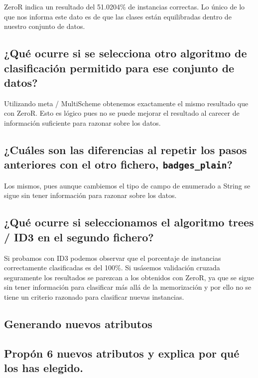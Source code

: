 \documentclass[12pt]{article}
\begin{document}
ZeroR indica un resultado del 51.0204\% de instancias correctas. Lo único de lo
que nos informa este dato es de que las clases están equilibradas dentro de
nuestro conjunto de datos.

\subsection{\small ¿Qué ocurre si se selecciona otro algoritmo de clasificación
permitido para ese conjunto de datos?}

Utilizando meta / MultiScheme obtenemos exactamente el mismo resultado que con
ZeroR. Esto es lógico pues no se puede mejorar el resultado al carecer de
información suficiente para razonar sobre los datos.

\subsection{\small ¿Cuáles son las diferencias al repetir los pasos anteriores
con el otro fichero, \texttt{badges\_plain}?}

Los mismos, pues aunque cambiemos el tipo de campo de enumerado a String se
sigue sin tener información para razonar sobre los datos.

\subsection{\small ¿Qué ocurre si seleccionamos el algoritmo trees / ID3 en el
segundo fichero?}

Si probamos con ID3 podemos observar que el porcentaje de instancias
correctamente clasificadas es del 100\%. Si usásemos validación cruzada
seguramente los resultados se parezcan a los obtenidos con ZeroR, ya que se
sigue sin tener información para clasificar más allá de la memorización y
por ello no se tiene un criterio razonado para clasificar nuevas instancias.

\newpage

\begin{center}
\section{Generando nuevos atributos}
\end{center}

\subsection{\small Propón 6 nuevos atributos y explica por qué los has elegido.}
\end{document}
